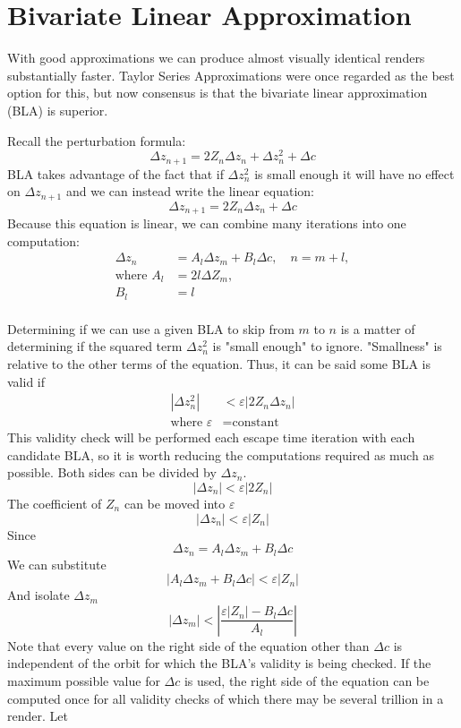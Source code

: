 \documentclass{article}
\begin{document}
\section{Bivariate Linear Approximation}
\par With good approximations we can produce almost visually identical renders substantially faster. Taylor Series Approximations were once regarded as the best option for this, but now consensus is that the bivariate linear approximation (BLA) is superior.
\par Recall the perturbation formula: 
\[
    \Delta z_{n+1} = 2Z_n\Delta z_n + \Delta z_n^2 + \Delta c
\] \cite{Thompson_2023}
BLA takes advantage of the fact that if $\Delta z_n^2$ is small enough it will have no effect on $\Delta z_{n+1}$ and we can instead write the linear equation:
\[
    \Delta z_{n+1} = 2Z_n\Delta z_n + \Delta c
\]
Because this equation is linear, we can combine many iterations into one computation:
\[
\begin{aligned}
    \Delta z_n &= A_l\Delta z_m + B_l\Delta c, \quad n = m + l, \\
    \text{where } A_l &= 2l\Delta Z_m,\\
    B_l &= l \\
\end{aligned}
\] \cite{Thompson_2023}
\par Determining if we can use a given BLA to skip from $m$ to $n$ is a matter of determining if the squared term $\Delta z_n^2$ is "small enough" to ignore. "Smallness" is relative to the other terms of the equation. Thus, it can be said some BLA is valid if
\[
\begin{aligned}
    |\Delta z_n^2| &< \varepsilon|2Z_n\Delta z_n| \\
    \text{where } \varepsilon &= \text{constant}
\end{aligned}
\]
This validity check will be performed each escape time iteration with each candidate BLA, so it is worth reducing the computations required as much as possible. 
Both sides can be divided by $\Delta z_n$.
\[
|\Delta z_n| < \varepsilon|2Z_n|
\]
The coefficient of $Z_n$ can be moved into $\varepsilon$
\[
|\Delta z_n| < \varepsilon|Z_n|
\]
Since
\[
\Delta z_n = A_l\Delta z_m + B_l\Delta c
\]
We can substitute
\[
|A_l\Delta z_m + B_l\Delta c| < \varepsilon|Z_n|
\]
And isolate $\Delta z_m$
\[
|\Delta z_m| < \left|\frac{\varepsilon|Z_n| - B_l\Delta c}{A_l}\right|
\] \cite{Thompson_2023}
Note that every value on the right side of the equation other than $\Delta c$ is independent of the orbit for which the BLA's validity is being checked. If the maximum possible value for $\Delta c$ is used, the right side of the equation can be computed once for all validity checks of which there may be several trillion in a render. Let 
\end{document}
